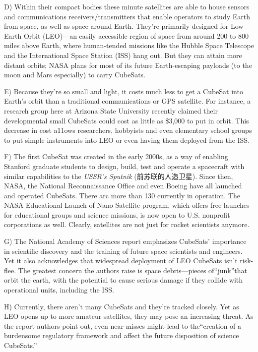 \documentclass[UTF8,11pt]{ctexart}
\begin{document}
D) Within their compact bodies these minute satellites are able to house sensors and communications receivers/transmitters that enable operators to study Earth from space, as well as space around Earth. They’re primarily designed for Low Earth Orbit (LEO)—an easily accessible region of space from around 200 to 800 miles above Earth, where human-tended missions like the Hubble Space Telescope and the International Space Station (ISS) hang out. But they can attain more distant orbits; NASA plans for most of its future Earth-escaping payloads (to the moon and Mars especially) to carry CubeSats.


E) Because they're so small and light, it costs much less to get a CubeSat into Earth’s orbit than a traditional communications or GPS satellite. For instance, a research group here at Arizona State University recently claimed their developmental small CubeSats could cost as little as \$3,000 to put in orbit. This decrease in cost a11ows researchers, hobbyists and even elementary school groups to put simple instruments into LEO or even having them deployed from the ISS.


F) The first CubeSat was created in the early 2000s, as a way of enabling Stanford graduate students to design, build, test and operate a spacecraft with similar capabilities to the\textit{ USSR’s Sputnik} (前苏联的人造卫星). Since then, NASA, the National Reconnaissance Office and even Boeing have all launched and operated CubeSats. There arc more than 130 currently in operation. The NASA Educational Launch of Nano Satellite program, which offers free launches for educational groups and science missions, is now open to U.S. nonprofit corporations as well. Clearly, satellites are not just for rocket scientists anymore.


G) The National Academy of Sciences report emphasizes CubeSats' importance in scientific discovery and the training of future space scientists and engineers. Yet it also acknowledges that widespread deployment of LEO CubeSats isn’t risk-flee. The greatest concern the authors raise is space debris—pieces of“junk”that orbit the earth, with the potential to cause serious damage if they collide with operational units, including the ISS.


H) Currently, there aren't many CubeSats and they're tracked closely. Yet as LEO opens up to more amateur satellites, they may pose an increasing threat. As the report authors point out, even near-misses might lead to the“creation of a burdensome regulatory framework and affect the future disposition of science CubeSats.”
\end{document}
